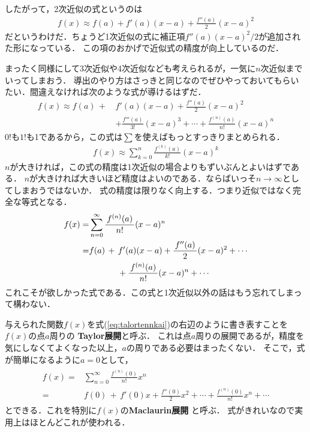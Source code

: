 したがって，2次近似の式というのは
\begin{align}
f(x) \approx f(a) + f'(a)(x-a) + \frac{f''(a)}{2}(x-a)^2
\label{nikaikinnji}
\end{align}
だというわけだ．ちょうど1次近似の式に補正項$f''(a)(x-a)^2 /2$が追加された形になっている．
この項のおかげで近似式の精度が向上しているのだ．

まったく同様にして3次近似や4次近似なども考えられるが，一気に$n$次近似までいってしまおう．
導出のやり方はさっきと同じなのでぜひやっておいてもらいたい．間違えなければ次のような式が導けるはずだ．
\begin{align*}
f(x) \approx f(a) \, + \, & f'(a)(x-a) + \frac{f''(a)}{2}(x-a)^2 \\
& + \frac{f'''(a)}{3!}(x-a)^3 + \cdots + \frac{f^{(n)}(a)}{n!}(x-a)^n
\label{nkaikinnji}
\end{align*}
$0!$も$1!$も1であるから，この式は$\sum$を使えばもっとすっきりまとめられる．
\begin{align}
f(x) \approx \sum_{k=0}^{n} \frac{f^{(k)}(a)}{k!} (x-a)^k
\end{align}
$n$が大きければ，この式の精度は1次近似の場合よりもずいぶんとよいはずである．
$n$が大きければ大きいほど精度はよいのである．ならばいっそ$n \to \infty$としてしまおうではないか．
式の精度は限りなく向上する．つまり近似ではなく完全な等式となる．
\begin{align}
\begin{aligned}
f(x) = & \sum_{n=0}^{\infty} \frac{f^{(n)}(a)}{n!} (x-a)^n \\
= & f(a) \, + \,  f'(a)(x-a) + \frac{f''(a)}{2}(x-a)^2 + \cdots \\
& \hspace{1.2cm}+ \frac{f^{(n)}(a)}{n!}(x-a)^n + \cdots 
\label{eq:talortennkai}
\end{aligned}
\end{align}
これこそが欲しかった式である．この式と1次近似以外の話はもう忘れてしまって構わない．

与えられた関数$f(x)$を式(\ref{eq:talortennkai})の右辺のように書き表すことを$f(x)$の点$a$周りの
\textbf{Taylor展開}と呼ぶ．
これは点$a$周りの展開であるが，精度を気にしなくてよくなった以上，$a$の周りである必要はまったくない．
そこで，式が簡単になるように$a=0$として，
\begin{align}
\begin{aligned}
f(x) = & \sum_{n=0}^{\infty} \frac{f^{(n)}(0)}{n!} x^n \\
= & f(0) \, + \,  f'(0)x + \frac{f''(0)}{2}x^2 + \cdots + \frac{f^{(n)}(0)}{n!}x^n + \cdots 
\label{eq:maclaurintennkai}
\end{aligned}
\end{align}
とできる．これを特別に$f(x)$の\textbf{Maclaurin展開}
と呼ぶ．
式がきれいなので実用上はほとんどこれが使われる．

